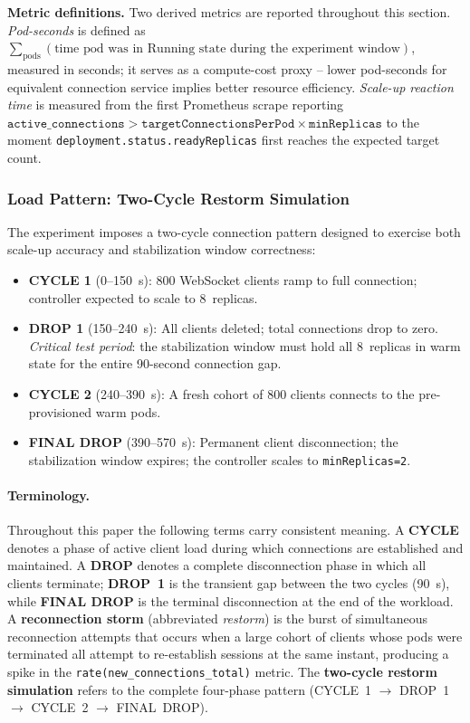 \documentclass[twocolumn]{svjour3}
\begin{document}
\textbf{Metric definitions.}  Two derived metrics are reported throughout this section.  \textit{Pod-seconds} is defined as $\sum_{\text{pods}} (\text{time pod was in Running state during the experiment window})$, measured in seconds; it serves as a compute-cost proxy -- lower pod-seconds for equivalent connection service implies better resource efficiency.  \textit{Scale-up reaction time} is measured from the first Prometheus scrape reporting $\texttt{active\_connections} > \texttt{targetConnectionsPerPod} \times \texttt{minReplicas}$ to the moment \texttt{deployment.status.readyReplicas} first reaches the expected target count.

\subsubsection{Load Pattern: Two-Cycle Restorm Simulation}

The experiment imposes a two-cycle connection pattern designed to exercise both scale-up accuracy and stabilization window correctness:

\begin{itemize}[leftmargin=*]
\item \textbf{CYCLE 1} (0--150~s): 800 WebSocket clients ramp to full connection; controller expected to scale to 8~replicas.
\item \textbf{DROP 1} (150--240~s): All clients deleted; total connections drop to zero. \textit{Critical test period}: the stabilization window must hold all 8~replicas in warm state for the entire 90-second connection gap.
\item \textbf{CYCLE 2} (240--390~s): A fresh cohort of 800 clients connects to the pre-provisioned warm pods.
\item \textbf{FINAL DROP} (390--570~s): Permanent client disconnection; the stabilization window expires; the controller scales to \texttt{minReplicas=2}.
\end{itemize}

\paragraph{Terminology.}  Throughout this paper the following terms carry consistent meaning.  A \textbf{CYCLE} denotes a phase of active client load during which connections are established and maintained.  A \textbf{DROP} denotes a complete disconnection phase in which all clients terminate; \textbf{DROP~1} is the transient gap between the two cycles (90~s), while \textbf{FINAL DROP} is the terminal disconnection at the end of the workload.  A \textbf{reconnection storm} (abbreviated \textit{restorm}) is the burst of simultaneous reconnection attempts that occurs when a large cohort of clients whose pods were terminated all attempt to re-establish sessions at the same instant, producing a spike in the \texttt{rate(new\_connections\_total)} metric.  The \textbf{two-cycle restorm simulation} refers to the complete four-phase pattern (CYCLE~1 $\rightarrow$ DROP~1 $\rightarrow$ CYCLE~2 $\rightarrow$ FINAL~DROP).
\end{document}
